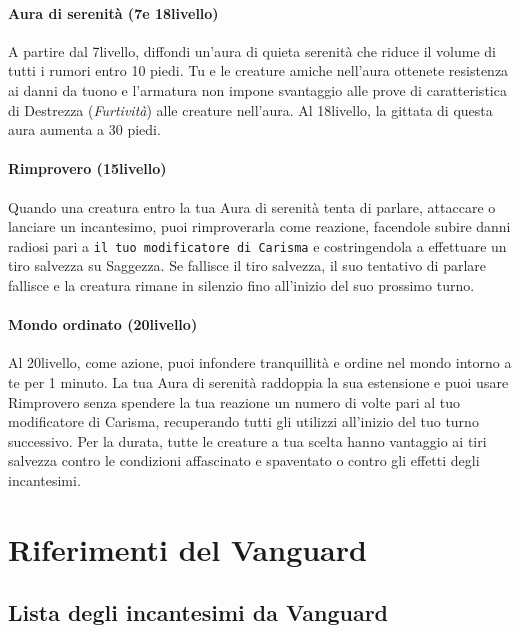 \documentclass[a4paper,10pt,twoside,twocolumn,openany,bg=full,nodeprecatedcode]{dndbook}
\begin{document}
\subsubsection{Aura di serenità (7\degree e 18\degree livello)}

A partire dal 7\degree livello, diffondi un'aura di quieta serenità che riduce il volume di tutti i rumori entro 10 piedi.
Tu e le creature amiche nell'aura ottenete resistenza ai danni da tuono e l'armatura non impone svantaggio alle prove di caratteristica di Destrezza (\emph{Furtività}) alle creature nell'aura.
Al 18\degree livello, la gittata di questa aura aumenta a 30 piedi.

\subsubsection{Rimprovero (15\degree livello)}

Quando una creatura entro la tua Aura di serenità tenta di parlare, attaccare o lanciare un incantesimo, puoi rimproverarla come reazione, facendole subire danni radiosi pari a \texttt{il tuo modificatore di Carisma} e costringendola a effettuare un tiro salvezza su Saggezza.
Se fallisce il tiro salvezza, il suo tentativo di parlare fallisce e la creatura rimane in silenzio fino all'inizio del suo prossimo turno.

\subsubsection{Mondo ordinato (20\degree livello)}

Al 20\degree livello, come azione, puoi infondere tranquillità e ordine nel mondo intorno a te per 1 minuto.
La tua Aura di serenità raddoppia la sua estensione e puoi usare Rimprovero senza spendere la tua reazione un numero di volte pari al tuo modificatore di Carisma, recuperando tutti gli utilizzi all'inizio del tuo turno successivo.
Per la durata, tutte le creature a tua scelta hanno vantaggio ai tiri salvezza contro le condizioni affascinato e spaventato o contro gli effetti degli incantesimi.

\chapter{Riferimenti del Vanguard}

\section{Lista degli incantesimi da Vanguard}
\end{document}
